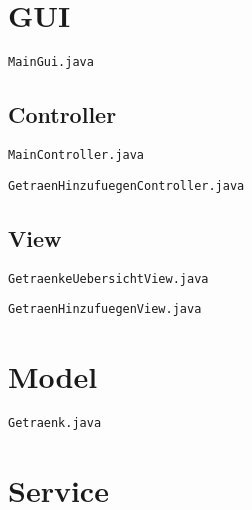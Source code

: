 \section{GUI}

\verb|MainGui.java|



\clearpage

\subsection{Controller}

\verb|MainController.java|



\clearpage

\verb|GetraenHinzufuegenController.java|



\clearpage

\subsection{View}

\verb|GetraenkeUebersichtView.java|



\clearpage

\verb|GetraenHinzufuegenView.java|



\clearpage

\section{Model}

\verb|Getraenk.java|



\clearpage

\section{Service}

